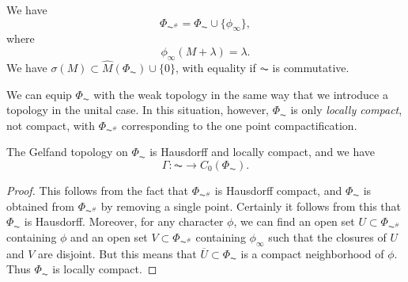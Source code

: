 \begin{corollary}
    We have
    \[ \Phi_{\AC^\#} = \Phi_{\AC} \cup \{ \phi_\infty \}, \]
    where
    \[ \phi_\infty(M + \lambda) = \lambda. \]
    We have $\sigma(M) \subset \widehat{M}(\Phi_{\AC}) \cup \{ 0 \}$, with equality if $\AC$ is commutative.
\end{corollary}

We can equip $\Phi_{\AC}$ with the weak topology in the same way that we introduce a topology in the unital case. In this situation, however, $\Phi_{\AC}$ is only \emph{locally compact}, not compact, with $\Phi_{\AC^\#}$ corresponding to the one point compactification.

\begin{theorem}
    The Gelfand topology on $\Phi_{\AC}$ is Hausdorff and locally compact, and we have
    \[ \Gamma: \AC \to C_0(\Phi_{\AC}). \]
\end{theorem}
\begin{proof}
    This follows from the fact that $\Phi_{\AC^\#}$ is Hausdorff compact, and $\Phi_{\AC}$ is obtained from $\Phi_{\AC^\#}$ by removing a single point. Certainly it follows from this that $\Phi_{\AC}$ is Hausdorff. Moreover, for any character $\phi$, we can find an open set $U \subset \Phi_{\AC^\#}$ containing $\phi$ and an open set $V \subset \Phi_{\AC^\#}$ containing $\phi_\infty$ such that the closures of $U$ and $V$ are disjoint. But this means that $\overline{U} \subset \Phi_{\AC}$ is a compact neighborhood of $\phi$. Thus $\Phi_{\AC}$ is locally compact.
%
%
%
\end{proof}

